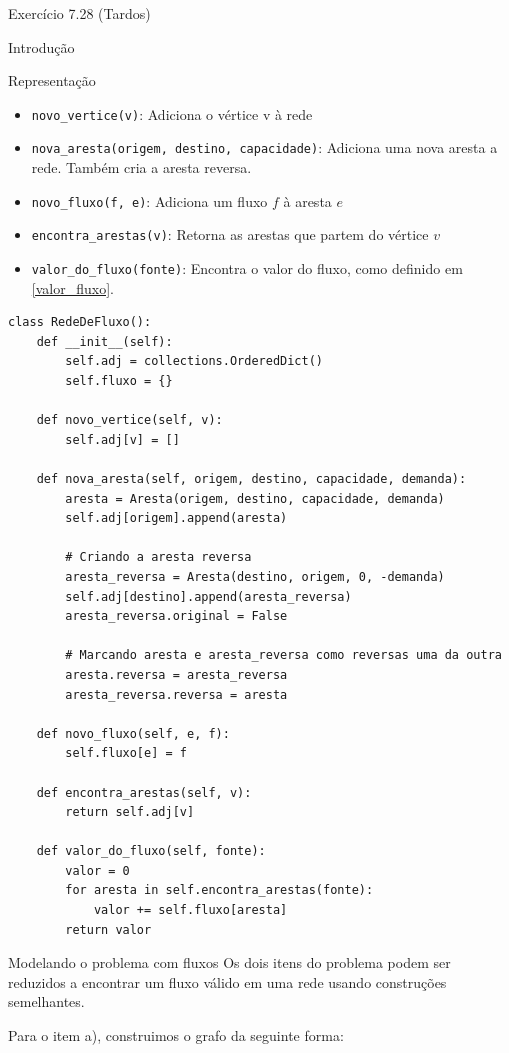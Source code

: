 \documentclass[presentation]{beamer}
\begin{document}
\begin{frame}[fragile,label=sec-2]{Exercício 7.28 (Tardos)}
\begin{block}{Introdução}
\begin{block}{Representação}
\begin{itemize}
\item \verb~novo_vertice(v)~: Adiciona o vértice v à rede
\item \verb~nova_aresta(origem, destino, capacidade)~: Adiciona uma nova aresta a
rede. Também cria a aresta reversa.
\item \verb~novo_fluxo(f, e)~: Adiciona um fluxo $f$ à aresta $e$
\item \verb~encontra_arestas(v)~: Retorna as arestas que partem do vértice $v$
\item \verb~valor_do_fluxo(fonte)~: Encontra o valor do fluxo, como definido em \eqref{valor_fluxo}.
\end{itemize}

\begin{verbatim}
class RedeDeFluxo():
    def __init__(self):
        self.adj = collections.OrderedDict()
        self.fluxo = {}

    def novo_vertice(self, v):
        self.adj[v] = []

    def nova_aresta(self, origem, destino, capacidade, demanda):
        aresta = Aresta(origem, destino, capacidade, demanda)
        self.adj[origem].append(aresta)

        # Criando a aresta reversa
        aresta_reversa = Aresta(destino, origem, 0, -demanda)
        self.adj[destino].append(aresta_reversa)
        aresta_reversa.original = False

        # Marcando aresta e aresta_reversa como reversas uma da outra
        aresta.reversa = aresta_reversa
        aresta_reversa.reversa = aresta

    def novo_fluxo(self, e, f):
        self.fluxo[e] = f

    def encontra_arestas(self, v):
        return self.adj[v]

    def valor_do_fluxo(self, fonte):
        valor = 0
        for aresta in self.encontra_arestas(fonte):
            valor += self.fluxo[aresta]
        return valor
\end{verbatim}
\end{block}
\end{block}

\begin{block}{Modelando o problema com fluxos\label{modelagem_fluxo}}
Os dois itens do problema podem ser reduzidos a encontrar um fluxo
válido em uma rede usando construções semelhantes.

Para o item a), construimos o grafo da seguinte forma:


\end{block}
\end{frame}
\end{document}
